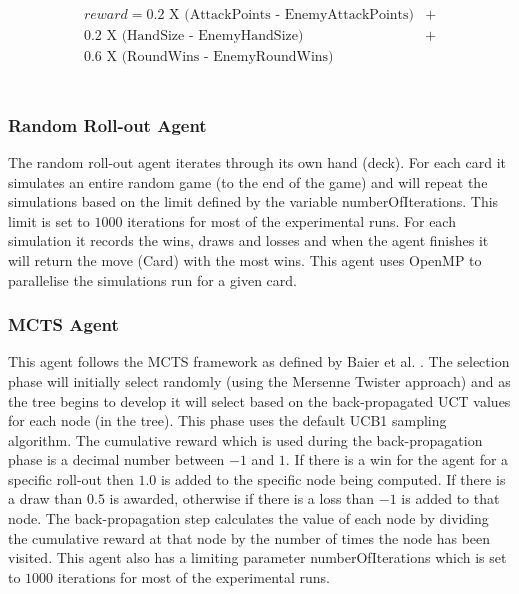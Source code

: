 \documentclass[journal]{IEEEtran}
\begin{document}
  \begin{equation} \label{eq:1}
  \begin{split}
  \begin{aligned}
    reward =  0.2 \text{ X } \text{(AttackPoints - EnemyAttackPoints)}  &+\\
              0.2 \text{ X (HandSize - EnemyHandSize)}  &+\\
              0.6 \text{ X (RoundWins - EnemyRoundWins)}  &
  \end{aligned}
  \end{split}
  \end{equation}
  \\
  \subsubsection{Random Roll-out Agent}
  The random roll-out agent iterates through its own hand (deck). For each card it simulates an entire random game (to the end of the game) and will repeat the simulations based on the limit defined by the variable numberOfIterations. This limit is set to $1000$ iterations for most of the experimental runs. For each simulation it records the wins, draws and losses and when the agent finishes it will return the move (Card) with the most wins. This agent uses OpenMP to parallelise the simulations run for a given card. \\

  \subsubsection{MCTS Agent}
  This agent follows the MCTS framework as defined by Baier et al. \cite{BEAM}. The selection phase will initially select randomly (using the Mersenne Twister approach) and as the tree begins to develop it will select based on the back-propagated UCT values for each node (in the tree). This phase uses the default UCB1 sampling algorithm. The cumulative reward which is used during the back-propagation phase is a decimal number between $-1$ and $1$. If there is a win for the agent for a specific roll-out then $1.0$ is added to the specific node being computed. If there is a draw than $0.5$ is awarded, otherwise if there is a loss than $-1$ is added to that node. The back-propagation step calculates the value of each node by dividing the cumulative reward at that node by the number of times the node has been visited. This agent also has a limiting parameter numberOfIterations which is set to $1000$ iterations for most of the experimental runs.
  \\
\end{document}
